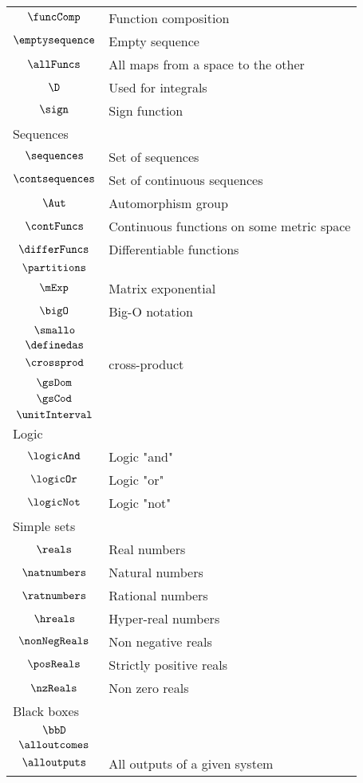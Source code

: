 \begin{longtable}{cl}
 $\funcComp$ &  Function composition\\ 
 $\emptysequence$ &  Empty sequence\\ 
 $\allFuncs$ &  All maps from a space to the other\\ 
 $\D$ &  Used for integrals\\ 
 $\sign$ &  Sign function\\ 
 \multicolumn{2}{l}{Sequences}\\ 
 \hline
$\sequences$ &  Set of sequences\\ 
 $\contsequences$ &  Set of continuous sequences\\ 
 $\Aut$ &  Automorphism group\\ 
 $\contFuncs$ &  Continuous functions on some metric space \\ 
 $\differFuncs$ &  Differentiable functions\\ 
 $\partitions$ & \\ 
 $\mExp$ &  Matrix exponential\\ 
 $\bigO$ &  Big-O notation\\ 
 $\smallo$ & \\ 
 $\definedas$ & \\ 
 $\crossprod$ &  cross-product\\ 
 $\gsDom$ &  \\ 
 $\gsCod$ &  \\ 
 $\unitInterval$ & \\ 
 \multicolumn{2}{l}{Logic}\\ 
 \hline
$\logicAnd$ &  Logic "and"\\ 
 $\logicOr$ &  Logic "or"\\ 
 $\logicNot$ &  Logic "not"\\ 
 \multicolumn{2}{l}{Simple sets}\\ 
 \hline
$\reals$ &  Real numbers\\ 
 $\natnumbers$ &  Natural numbers\\ 
 $\ratnumbers$ &  Rational numbers\\ 
 $\hreals$ &  Hyper-real numbers\\ 
 $\nonNegReals$ &  Non negative reals \\ 
 $\posReals$ &  Strictly positive reals\\ 
 $\nzReals$ &  Non zero reals\\ 
 \multicolumn{2}{l}{Black boxes}\\ 
 \hline
$\bbD$ & \\ 
 $\alloutcomes$ & \\ 
 $\alloutputs$ &  All outputs of a given system\\ 

\end{longtable}
